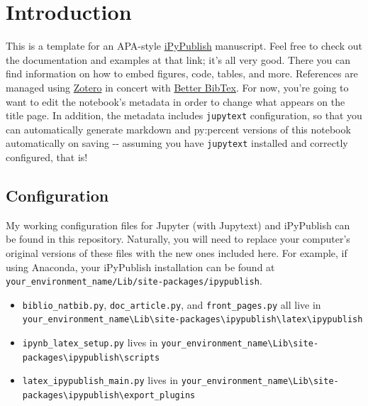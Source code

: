 \documentclass[10pt,parskip=half,
	toc=sectionentrywithdots,
	bibliography=totocnumbered,
	captions=tableheading,
    numbers=noendperiod,
    headings=standardclasses]{scrartcl}
\providecommand{\tightlist}{%
  \setlength{\itemsep}{0pt}\setlength{\parskip}{0pt}}
\begin{document}
		\begingroup
    \let\cleardoublepage\relax
    \let\clearpage\relax%
	\thispagestyle{empty}
    \tableofcontents
    \endgroup

\section{Introduction}\label{introduction}

This is a template for an APA-style
\href{https://github.com/chrisjsewell/ipypublish}{iPyPublish}
manuscript. Feel free to check out the documentation and examples at
that link; it's all very good. There you can find information on how to
embed figures, code, tables, and more. References are managed using
\href{https://www.zotero.org/}{Zotero} in concert with
\href{https://github.com/retorquere/zotero-better-bibtex/}{Better
BibTex}. For now, you're going to want to edit the notebook's metadata
in order to change what appears on the title page. In addition, the
metadata includes \texttt{jupytext} configuration, so that you can
automatically generate markdown and py:percent versions of this notebook
automatically on saving -\/- assuming you have \texttt{jupytext}
installed and correctly configured, that is!

\subsection{Configuration}\label{configuration}

My working configuration files for Jupyter (with Jupytext) and
iPyPublish can be found in this repository. Naturally, you will need to
replace your computer's original versions of these files with the new
ones included here. For example, if using Anaconda, your iPyPublish
installation can be found at
\texttt{your\_environment\_name/Lib/site-packages/ipypublish}.

\begin{itemize}
\tightlist
\item
  \texttt{biblio\_natbib.py}, \texttt{doc\_article.py}, and
  \texttt{front\_pages.py} all live in
  \texttt{your\_environment\_name\textbackslash{}Lib\textbackslash{}site-packages\textbackslash{}ipypublish\textbackslash{}latex\textbackslash{}ipypublish}
\item
  \texttt{ipynb\_latex\_setup.py} lives in
  \texttt{your\_environment\_name\textbackslash{}Lib\textbackslash{}site-packages\textbackslash{}ipypublish\textbackslash{}scripts}
\item
  \texttt{latex\_ipypublish\_main.py} lives in
  \texttt{your\_environment\_name\textbackslash{}Lib\textbackslash{}site-packages\textbackslash{}ipypublish\textbackslash{}export\_plugins}
\end{itemize}
\end{document}
